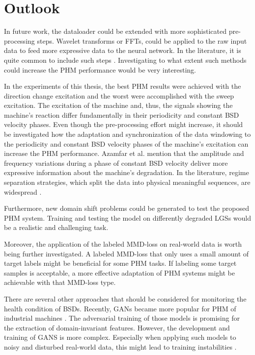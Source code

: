 \chapter{Outlook}
In future work, the dataloader could be extended with more sophisticated pre-processing steps. Wavelet transforms or FFTs, could be applied to the raw input data to feed more expressive data to the neural network. In the literature, it is quite common to include such steps \cite{LiPin2018} \cite{Li2018} \cite{Kang2020} \cite{Zhang2017}. Investigating to what extent such methods could increase the PHM performance would be very interesting.

In the experiments of this thesis, the best PHM results were achieved with the direction change excitation and the worst were accomplished with the sweep excitation. The excitation of the machine and, thus, the signals showing the machine’s reaction differ fundamentally in their periodicity and constant BSD velocity phases. Even though the pre-processing effort might increase, it should be investigated how the adaptation and synchronization of the data windowing to the periodicity and constant BSD velocity phases of the machine's excitation can increase the PHM performance. Azamfar et al. \cite{AZAMFAR2020103932} mention that the amplitude and frequency variations during a phase of constant BSD velocity deliver more expressive information about the machine's degradation. In the literature, regime separation strategies, which split the data into physical meaningful sequences, are widespread \cite{AZAMFAR2020103932} \cite{Pandhare2021}.

Furthermore, new domain shift problems could be generated to test the proposed PHM system. Training and testing the model on differently degraded LGSs would be a realistic and challenging task.

Moreover, the application of the labeled MMD-loss on real-world data is worth being further investigated. A labeled MMD-loss that only uses a small amount of target labels might be beneficial for some PHM tasks. If labeling some target samples is acceptable, a more effective adaptation of PHM systems might be achievable with that MMD-loss type.

There are several other approaches that should be considered for monitoring the health condition of BSDs. Recently, GANs became more popular for PHM of industrial machines \cite{Zhang2019}. The adversarial training of those models is promising for the extraction of domain-invariant features. However, the development and training of GANS is more complex. Especially when applying such models to noisy and disturbed real-world data, this might lead to training instabilities \cite{Zhang2019}. 



